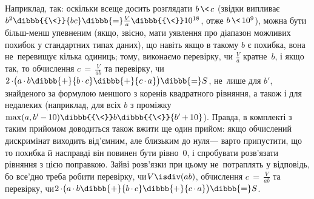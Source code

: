 Наприклад, так: оскільки все\nolinebreak[3] ще досить розглядати $b\,{\<}\,c$ (звідки випливає $b^2\dibbb{{\<}}{bc}\dibbb{{=}}\frac{V}{a}\dibbb{{\<}}10^{18}$, отже ${b\,{\<}\,10^9}$), можна бути більш-менш упевненим (якщо, звісно, мати уявлення про діапазон можливих похибок у стандартних типах даних), що навіть якщо в такому $b$ є похибка, вона не~перевищує кілька одиниць; тому, виконаємо перевірку, чи $\frac{V}{a}$ кратне~$b$, і якщо так, то обчислення $c\,{=}\,\frac{V}{ab}$ та перевірку, чи ${2\,{\cdot}\bigl(a\,{\cdot}\,b}\dibbb{{+}}{b\,{\cdot}\,c}\dibbb{{+}}{c\,{\cdot}\,a}\bigr)\dibbb{{=}}S$, не~лише для $b'$, знайденого за формулою меншого з коренів квадратного рівняння, а також і для недалеких (наприклад, для всіх $b$ з проміжку ${\max(a, b'\,{-}\,10)}\dibbb{{\<}}b\dibbb{{\<}}{b'\,{+}\,10}$). Правда, в комплекті з таким прийомом доводиться також вжити ще один прийом: якщо обчислений дискримінат виходить від'ємним, але близьким до нуля\nolinebreak[3] --- варто припустити, що то похибка й насправді він повинен бути рівно~0, і спробувати розв'язати рівняння з цією поправкою. Зайві розв'язки при цьому не~потраплять у відповідь, бо все'дно треба робити перевірку, чи\nolinebreak[2] $V\isdiv(ab)$, обчислення $c\,{=}\,\frac{V}{ab}$ та перевірку, чи\nolinebreak[2] ${2\,{\cdot}\bigl(a\,{\cdot}\,b}\dibbb{{+}}{b\,{\cdot}\,c}\dibbb{{+}}{c\,{\cdot}\,a}\bigr)\dibbb{{=}}S$. 

